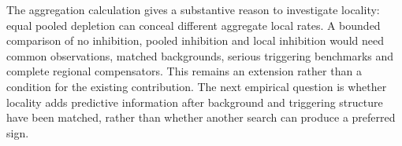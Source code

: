 The aggregation calculation gives a substantive reason to investigate locality: equal pooled depletion can conceal different aggregate local rates. A bounded comparison of no inhibition, pooled inhibition and local inhibition would need common observations, matched backgrounds, serious triggering benchmarks and complete regional compensators. This remains an extension rather than a condition for the existing contribution. The next empirical question is whether locality adds predictive information after background and triggering structure have been matched, rather than whether another search can produce a preferred sign.
